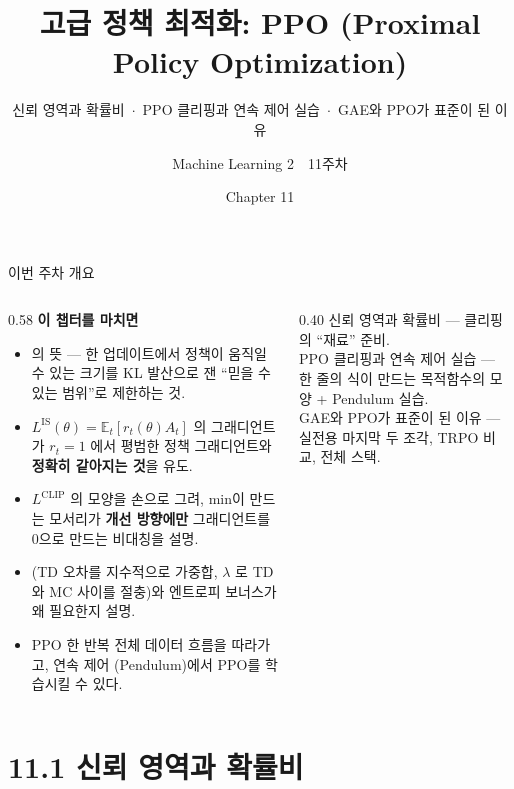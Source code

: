 \documentclass[aspectratio=169,11pt]{beamer}
\title{고급 정책 최적화: PPO (Proximal Policy Optimization)}
\subtitle{신뢰 영역과 확률비 \,$\cdot$\, PPO 클리핑과 연속 제어 실습 \,$\cdot$\, GAE와 PPO가 표준이 된 이유}
\author{Machine Learning 2 \,\textperiodcentered\, 11주차}
\institute{한국과학영재학교 (KSA)}
\date{Chapter 11}
\begin{document}
\begin{frame}
  \titlepage
\end{frame}

\begin{frame}{이번 주차 개요}
  \small
  \begin{columns}[T]
    \begin{column}{0.58\textwidth}
      \textbf{이 챕터를 마치면}
      \begin{itemize}
        \item {}의 뜻 — 한 업데이트에서 정책이 움직일 수
          있는 크기를 KL 발산으로 잰 ``믿을 수 있는 범위''로 제한하는 것.
        \item $L^{\mathrm{IS}}(\theta)=\mathbb{E}_t[r_t(\theta)A_t]$ 의
          그래디언트가 $r_t=1$ 에서 평범한 정책 그래디언트와
          \textbf{정확히 같아지는 것}을 유도.
        \item $L^{\mathrm{CLIP}}$ 의 모양을 손으로 그려, min이 만드는
          모서리가 \textbf{개선 방향에만} 그래디언트를 0으로 만드는
          비대칭을 설명.
        \item {}(TD 오차를 지수적으로 가중합, $\lambda$ 로 TD와
          MC 사이를 절충)와 엔트로피 보너스가 왜 필요한지 설명.
        \item PPO 한 반복 전체 데이터 흐름을 따라가고, 연속 제어
          (Pendulum)에서 PPO를 학습시킬 수 있다.
      \end{itemize}
    \end{column}
    \begin{column}{0.40\textwidth}
       신뢰 영역과 확률비 — 클리핑의 ``재료'' 준비.
      \\[0.5em]
       PPO 클리핑과 연속 제어 실습 — 한 줄의 식이 만드는
      목적함수의 모양 + Pendulum 실습.
      \\[0.5em]
       GAE와 PPO가 표준이 된 이유 — 실전용 마지막 두 조각,
      TRPO 비교, 전체 스택.
    \end{column}
  \end{columns}
\end{frame}

\section{11.1 신뢰 영역과 확률비}
\end{document}
